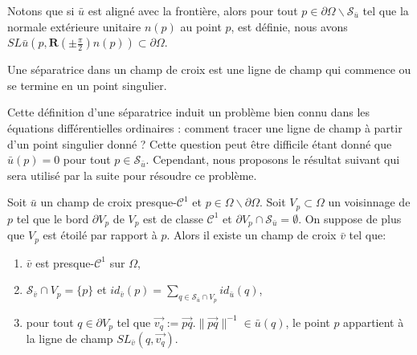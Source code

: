 \begin{remark}
Notons que si $\bar{u}$ est aligné avec la frontière, alors pour tout $p\in \partial \Omega \backslash \mathcal{S}_{\bar{u}}$ tel que la normale extérieure unitaire $n(p)$ au point $p$, est définie, nous avons $SL{\bar{u}}\left(p,\mathbf{R}\left(\pm \frac{\pi}{2}\right)n(p)\right) \subset \partial \Omega$.
\end{remark}

\begin{definition}[Séparatrice] \label{def:sep}
Une séparatrice dans un champ de croix est une ligne de champ qui commence ou se termine en un point singulier.
\end{definition}

Cette définition d'une séparatrice induit un problème bien connu dans les équations différentielles ordinaires : comment tracer une ligne de champ à partir d'un point singulier donné ? Cette question peut être difficile étant donné que $\bar{u}(p)={0}$ pour tout $p\in \mathcal{S}_{\bar{u}}$. Cependant, nous proposons le résultat suivant qui sera utilisé par la suite pour résoudre ce problème.
\begin{proposition}
\label{prop:stream_from_interior_sing}
Soit $\bar{u}$ un champ de croix presque-$\mathcal{C}^1$ et $p\in \Omega\backslash\partial\Omega$. Soit $V_p\subset\Omega$ un voisinnage de $p$ tel que le bord $\partial V_p$ de $V_p$ est de classe $\mathcal{C}^1$ et $\partial V_p\cap\mathcal{S}_{\bar{u}}=\emptyset$. On suppose de plus que $V_p$ est étoilé par rapport à $p$. Alors il existe un champ de croix $\bar{v}$ tel que:\\[-0.3cm]
\begin{enumerate}
\item $\bar{v}$ est presque-$\mathcal{C}^1$ sur $\Omega$,\\[-0.3cm]
\item $\mathcal{S}_{\bar{v}}\cap V_p =\{p\}$ et $id_{\bar{v}}(p)=\sum_{q\in \mathcal{S}_{\bar{u}}\cap V_p} id_{\bar{u}}(q)$,\\[-0.3cm]
\item pour tout $q\in \partial V_p$ tel que $\overrightarrow{v_q}:=\overrightarrow{pq}.\|\overrightarrow{pq}\|^{-1}\in \bar{u}(q)$, le point $p$ appartient à la ligne de champ $SL_{\bar{v}}(q,\overrightarrow{v_q})$.\\[-0.3cm]
\end{enumerate}
\end{proposition}

